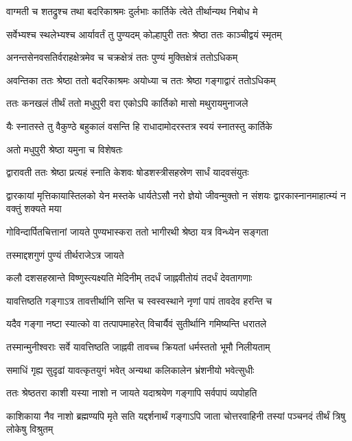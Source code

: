 \twolineshloka
{वाग्मती च शतद्रुश्च तथा बदरिकाश्रमः}
{दुर्लभाः कार्तिके त्वेते तीर्थान्यथ निबोध मे} %

\twolineshloka
{सर्वेभ्यश्च स्थलेभ्यश्च आर्यावर्तं तु पुण्यदम्}
{कोल्हापुरी ततः श्रेष्ठा ततः काञ्चीद्वयं स्मृतम्} %

\twolineshloka
{अनन्तसेनवसतिर्वराहक्षेत्रमेव च}
{चक्रक्षेत्रं ततः पुण्यं मुक्तिक्षेत्रं ततोऽधिकम्} %

\twolineshloka
{अवन्तिका ततः श्रेष्ठा ततो बदरिकाश्रमः}
{अयोध्या च ततः श्रेष्ठा गङ्गाद्वारं ततोऽधिकम्} %

\twolineshloka
{ततः कनखलं तीर्थं ततो मधुपुरी वरा}
{एकोऽपि कार्तिको मासो मथुरायमुनाजले} %

\twolineshloka
{यैः स्नातस्ते तु वैकुण्ठे बहुकालं वसन्ति हि}
{राधादामोदरस्तत्र स्वयं स्नातस्तु कार्तिके} %


\onelineshloka
{अतो मधुपुरी श्रेष्ठा यमुना च विशेषतः} %

\twolineshloka
{द्वारावती ततः श्रेष्ठा प्रत्यहं स्नाति केशवः}
{षोडशस्त्रीसहस्रेण सार्धं यादवसंयुतः} %

\threelineshloka
{द्वारकायां मृत्तिकायास्तिलको येन मस्तके}
{धार्यतेऽसौ नरो ज्ञेयो जीवन्मुक्तो न संशयः}
{द्वारकास्नानमाहात्म्यं न वक्तुं शक्यते मया} %

\twolineshloka
{गोविन्दार्पितचित्तानां जायते पुण्यभास्करा}
{ततो भागीरथी श्रेष्ठा यत्र विन्ध्येन सङ्गता} %


\onelineshloka
{तस्माद्दशगुणं पुण्यं तीर्थराजेऽत्र जायते} %

\twolineshloka
{कलौ दशसहस्रान्ते विष्णुस्त्यक्ष्यति मेदिनीम्}
{तदर्धं जाह्नवीतोयं तदर्धं देवतागणाः} %

\twolineshloka
{यावत्तिष्ठति गङ्गाऽत्र तावत्तीर्थानि सन्ति च}
{स्वस्वस्थाने नृणां पापं तावदेव हरन्ति च} %

\twolineshloka
{यदैव गङ्गा नष्टा स्यात्को वा तत्पापमाहरेत्}
{विचार्यैवं सुतीर्थानि गमिष्यन्ति धरातले} %

\twolineshloka
{तस्मान्मुनीश्वराः सर्वे यावत्तिष्ठति जाह्नवी}
{तावच्च क्रियतां धर्मस्ततो भूमौ निलीयताम्} %

\twolineshloka
{समाधिं गृह्य सुदृढां यावत्कृतयुगं भवेत्}
{अन्यथा कलिकालेन भ्रंशनीयो भवेत्सुधीः} %

\twolineshloka
{ततः श्रेष्ठतरा काशी यस्या नाशो न जायते}
{यदाश्रयेण गङ्गापि सर्वपापं व्यपोहति} %

\threelineshloka
{काशिकाया नैव नाशो ब्रह्मण्यपि मृते सति}
{यद्दर्शनार्थं गङ्गाऽपि जाता चोत्तरवाहिनी}
{तस्यां पञ्चनदं तीर्थं त्रिषु लोकेषु विश्रुतम्} %

